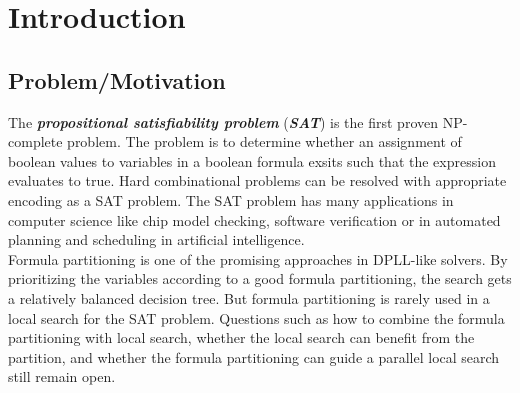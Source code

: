 \documentclass[12pt,a4paper,twoside]{scrartcl}
\numberwithin{equation}{section}
\begin{document}
\vfill\vfill\vfill
\clearpage


\pagestyle{plain}
  
\renewcommand\sectionmark[1]{\markboth{\thesection\quad\MakeUppercase{#1}}{\thesection\quad\MakeUppercase{#1}}}
\renewcommand\subsectionmark[1]{\markright{\thesubsection\quad\MakeUppercase{#1}}}


\tableofcontents
\afterpage{\null\newpage}
\clearpage

\pagestyle{normal}

\section{Introduction} 
\label{sec:Intro}
\subsection{Problem/Motivation} 
The \emph{\textbf{propositional satisfiability problem}} (\emph{\textbf{SAT}}) is the first proven NP-complete problem\cite{cook1971complexity}. The problem is to determine whether an assignment of boolean values to variables in a boolean formula exsits such that the expression evaluates to true. Hard combinational problems can be resolved with appropriate encoding as a SAT problem.
The SAT problem has many applications in computer science like chip model checking\cite{clarke2001bounded}, software verification\cite{ivanvcic2008efficient} or in automated planning and scheduling in artificial intelligence\cite{kautz1999unifying}. \\
Formula partitioning is one of the promising approaches in DPLL-like solvers\cite{mann2017guiding}. By prioritizing the variables according to a good formula partitioning, the search gets a relatively balanced decision tree. But formula partitioning is rarely used in a local search for the SAT problem. Questions such as how to combine the formula partitioning with local search, whether the local search can benefit from the partition, and whether the formula partitioning can guide a parallel local search still remain open. 
\end{document}
